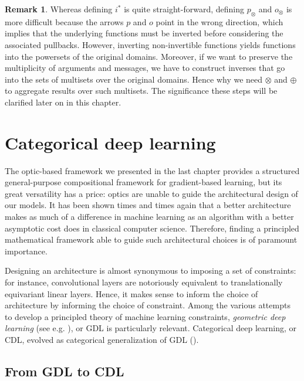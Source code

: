 \documentclass[11pt,a4paper,openright,twoside]{report}
\newcounter{mycounter}
\theoremstyle{plain}
\theoremstyle{definition}
\newtheorem{remark}[mycounter]{Remark}
\begin{document}
\begin{remark}
  Whereas defining $i^*$ is quite straight-forward, defining $p_{\otimes}$ and $o_{\otimes}$ is more difficult because the arrows $p$ and $o$ point in the wrong direction, which implies that the underlying functions must be inverted before considering the associated pullbacks. However, inverting non-invertible functions yields functions into the powersets of the original domains. Moreover, if we want to preserve the multiplicity of arguments and messages, we have to construct inverses that go into the sets of multisets over the original domains. Hence why we need $\otimes$ and $\oplus$ to aggregate results over such multisets.
  The significance these steps will be clarified later on in this chapter.
\end{remark}



\section{Categorical deep learning}

The optic-based framework we presented in the last chapter provides a structured general-purpose compositional framework for gradient-based learning, but its great versatility has a price: optics are unable to guide the architectural design of our models. It has been shown times and times again that a better architecture makes as much of a difference in machine learning as an algorithm with a better asymptotic cost does in classical computer science. 
Therefore, finding a principled mathematical framework able to guide such architectural choices is of paramount importance. 


Designing an architecture is almost synonymous to imposing a set of constraints: for instance, convolutional layers are notoriously equivalent to translationally equivariant linear layers. Hence, it makes sense to inform the choice of architecture by informing the choice of constraint. Among the various attempts to develop a principled theory of machine learning constraints, \textit{geometric deep learning} (see e.g. \cite{bronstein2021geometric}), or GDL is particularly relevant. Categorical deep learning, or CDL, evolved as categorical generalization of GDL (\cite{gavranovicposition}).


\subsection{From GDL to CDL}
\end{document}
